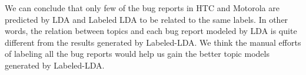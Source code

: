 \documentclass[10pt, conference, compsocconf]{IEEEtran}
\begin{document}


We can conclude that only few of the bug reports in HTC and Motorola are predicted by LDA and Labeled LDA to be related to the same labels. In other words, the relation between topics and each bug report modeled by LDA is quite different from the results generated by Labeled-LDA. We think the manual efforts of labeling all the bug reports would help us gain the better topic models generated by Labeled-LDA. 


\end{document}
